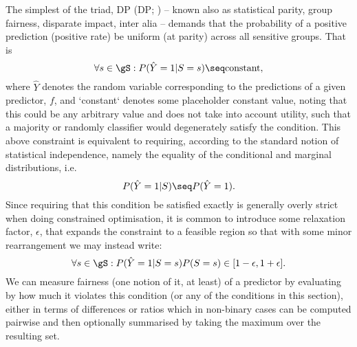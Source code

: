 %
The simplest of the triad, \acl{DP} (\acs{DP}; \citealp{zemel2013learning,
feldman2015certifying}) -- known also as statistical parity, group fairness, disparate impact,
inter alia -- demands that the probability of a positive prediction (positive rate) be uniform
(at parity) across all sensitive groups. 
%
That is
%
\begin{equation}
    \forall s \in \gS: P( \hat{Y} = 1 | S = s ) \seq \text{constant},
\end{equation}
%
where \(\hat{Y}\) denotes the random variable corresponding to the predictions of a given
predictor, \(f\), and `constant` denotes some placeholder constant value, noting that this could be
any arbitrary value and does not take into account utility, such that a majority or randomly
classifier would degenerately satisfy the condition. 
%
This above constraint is equivalent to requiring, according to the standard notion of statistical
independence, namely the equality of the conditional and marginal distributions, i.e.
%
\begin{equation}
    P( \hat{Y} = 1 | S) \seq P( \hat{Y} = 1 ).
\end{equation}
%
%
Since requiring that this condition be satisfied exactly is generally overly strict when doing
constrained optimisation, it is common to introduce some relaxation factor, \(\epsilon\), that
expands the constraint to a feasible region so that with some minor rearrangement we may instead
write:
%
\begin{equation}
    \forall s \in \gS: P(\hat{Y}=1|S=s) P(S=s) \in [ 1 - \epsilon, 1 + \epsilon ]. 
%
\end{equation}
%
We can measure fairness (one notion of it, at least) of a predictor by evaluating by how much it
violates this condition (or any of the conditions in this section), either in terms of differences
or ratios  which in non-binary cases can be computed pairwise and then optionally summarised by
taking the maximum over the resulting set.

